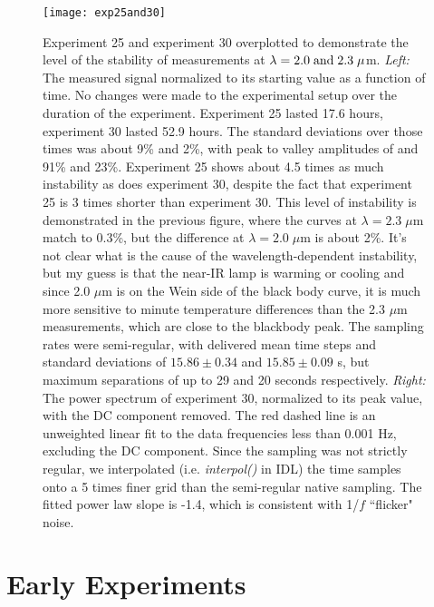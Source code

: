 \begin{figure}
\begin{center}
    \texttt{[image: exp25and30]}
  \end{center}
  \caption[Stability experiment]{Experiment 25 and experiment 30 overplotted to demonstrate the level of the stability of measurements at $\lambda = 2.0 \; \rm{ and } \;2.3\; \mu$m. \emph{Left:} The measured signal normalized to its starting value as a function of time.  No changes were made to the experimental setup over the duration of the experiment.  Experiment 25 lasted 17.6 hours, experiment 30 lasted 52.9 hours.  The standard deviations over those times was about 9\% and 2\%, with peak to valley amplitudes of and 91\% and 23\%.  Experiment 25 shows about 4.5 times as much instability as does experiment 30, despite the fact that experiment 25 is 3 times shorter than experiment 30.  This level of instability is demonstrated in the previous figure, where the curves at $\lambda=2.3 \; \mu$m match to 0.3\%, but the difference at $\lambda=2.0\;\mu$m is about 2\%.  It's not clear what is the cause of the wavelength-dependent instability, but my guess is that the near-IR lamp is warming or cooling and since 2.0 $\mu$m is on the Wein side of the black body curve, it is much more sensitive to minute temperature differences than the 2.3 $\mu$m measurements, which are close to the blackbody peak.  The sampling rates were semi-regular, with delivered mean time steps and standard deviations of $15.86\pm0.34$ and $15.85\pm0.09$ s, but maximum separations of up to 29 and 20 seconds respectively.  \emph{Right:} The power spectrum of experiment 30, normalized to its peak value, with the DC component removed.  The red dashed line is an unweighted linear fit to the data frequencies less than 0.001 Hz, excluding the DC component.  Since the sampling was not strictly regular, we interpolated (i.e. \emph{interpol()} in IDL) the time samples onto a 5 times finer grid than the semi-regular native sampling.  The fitted power law slope is -1.4, which is consistent with 1/$f$ ``flicker" noise.}
\end{figure}



\section{Early Experiments}

